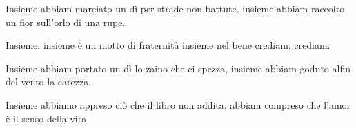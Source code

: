 
\beginverse

Insieme abbiam marciato un dì
per strade non battute,
insieme abbiam raccolto un fior
sull'orlo di una rupe.

\endverse

\beginchorus

Insieme, insieme è un motto di fraternità
insieme nel bene crediam, crediam.

\endchorus

\beginverse

Insieme abbiam portato un dì
lo zaino che ci spezza,
insieme abbiam goduto alfin
del vento la carezza.

\endverse

\beginverse

Insieme abbiamo appreso ciò
che il libro non addita,
abbiam compreso che l'amor
è il senso della vita.

\endverse

\endsong


